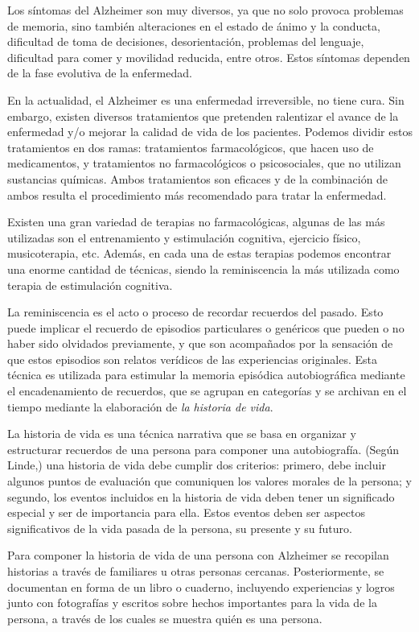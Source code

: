 Los síntomas del Alzheimer son muy diversos, ya que no solo provoca problemas de memoria, sino también alteraciones en el estado de ánimo y la conducta, dificultad de toma de decisiones, desorientación, problemas del lenguaje, dificultad para comer y movilidad reducida, entre otros. Estos síntomas dependen de la fase evolutiva de la enfermedad.

En la actualidad, el Alzheimer es una enfermedad irreversible, no tiene cura. Sin embargo, existen diversos tratamientos que pretenden ralentizar el avance de la enfermedad y/o mejorar la calidad de vida de los pacientes. Podemos dividir estos tratamientos en dos ramas: tratamientos farmacológicos, que hacen uso de medicamentos, y tratamientos no farmacológicos o psicosociales, que no utilizan sustancias químicas. Ambos tratamientos son eficaces y de la combinación de ambos resulta el procedimiento más recomendado para tratar la enfermedad.

Existen una gran variedad de terapias no farmacológicas, algunas de las más utilizadas son el entrenamiento y estimulación cognitiva, ejercicio físico, musicoterapia, etc. Además, en cada una de estas terapias podemos encontrar una enorme cantidad de técnicas, siendo la reminiscencia la más utilizada como terapia de estimulación cognitiva.

La reminiscencia es el acto o proceso de recordar recuerdos del pasado. Esto puede implicar el recuerdo de episodios particulares o genéricos que pueden o no haber sido olvidados previamente, y que son acompañados por la sensación de que estos episodios son relatos verídicos de las experiencias originales. Esta técnica es utilizada para estimular la memoria episódica autobiográfica mediante el encadenamiento de recuerdos, que se agrupan en categorías y se archivan en el tiempo mediante la elaboración de \textit{la historia de vida}.

La historia de vida es una técnica narrativa que se basa en organizar y estructurar recuerdos de una persona para componer una autobiografía. (Según Linde,) una historia de vida debe cumplir dos criterios: primero, debe incluir algunos puntos de evaluación que comuniquen los valores morales de la persona; y segundo, los eventos incluidos en la historia de vida deben tener un significado especial y ser de importancia para ella. Estos eventos deben ser aspectos significativos de la vida pasada de la persona, su presente y su futuro.

Para componer la historia de vida de una persona con Alzheimer se recopilan historias a través de familiares u otras personas cercanas. Posteriormente, se documentan en forma de un libro o cuaderno, incluyendo experiencias y logros junto con fotografías y escritos sobre hechos importantes para la vida de la persona, a través de los cuales se muestra quién es una persona.

